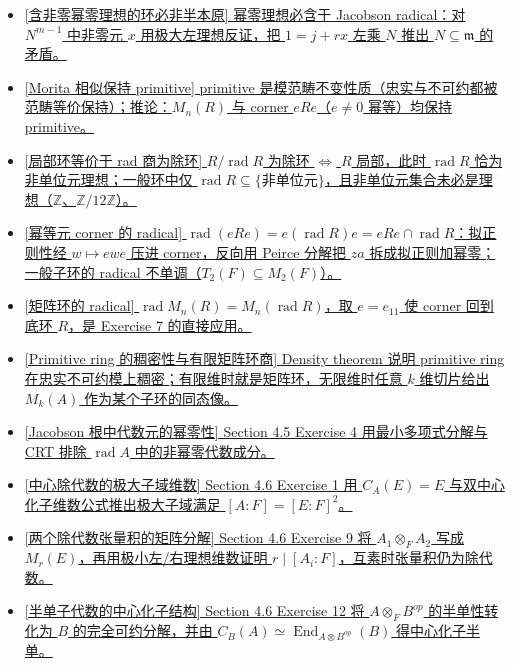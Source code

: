 \documentclass[a4paper]{ctexart}
\theoremstyle{definition}
\theoremstyle{analysis}
\theoremstyle{plain}
\begin{document}
\begin{itemize}
  \item \hyperref[subsec:problem-nilpotent-ideal-not-semiprimitive]{[含非零幂零理想的环必非半本原] 幂零理想必含于 Jacobson radical：对 \(N^{m-1}\) 中非零元 \(x\) 用极大左理想反证，把 \(1=j+rx\) 左乘 \(N\) 推出 \(N\subseteq\mathfrak m\) 的矛盾。}
  \item \hyperref[subsec:problem-morita-primitive]{[Morita 相似保持 primitive] primitive 是模范畴不变性质（忠实与不可约都被范畴等价保持）；推论：\(M_n(R)\) 与 corner \(eRe\)（\(e\neq 0\) 幂等）均保持 primitive。}
  \item \hyperref[subsec:problem-local-rad-division-ring]{[局部环等价于 rad 商为除环] \(R/\operatorname{rad}R\) 为除环 \(\iff\) \(R\) 局部，此时 \(\operatorname{rad}R\) 恰为非单位元理想；一般环中仅 \(\operatorname{rad}R\subseteq\{\text{非单位元}\}\)，且非单位元集合未必是理想（\(\mathbb Z\)、\(\mathbb Z/12\mathbb Z\)）。}
  \item \hyperref[subsec:problem-rad-corner-idempotent]{[幂等元 corner 的 radical] \(\operatorname{rad}(eRe)=e(\operatorname{rad}R)e=eRe\cap\operatorname{rad}R\)：拟正则性经 \(w\mapsto ewe\) 压进 corner，反向用 Peirce 分解把 \(za\) 拆成拟正则加幂零；一般子环的 radical 不单调（\(T_2(F)\subseteq M_2(F)\)）。}
  \item \hyperref[subsec:problem-rad-matrix-ring]{[矩阵环的 radical] \(\operatorname{rad}M_n(R)=M_n(\operatorname{rad}R)\)，取 \(e=e_{11}\) 使 corner 回到底环 \(R\)，是 Exercise 7 的直接应用。}
  \item \hyperref[subsec:problem-density-matrix-image]{[Primitive ring 的稠密性与有限矩阵环商] Density theorem 说明 primitive ring 在忠实不可约模上稠密；有限维时就是矩阵环，无限维时任意 \(k\) 维切片给出 \(M_k(A)\) 作为某个子环的同态像。}
  \item \hyperref[subsec:problem-radical-algebraic-nilpotent]{[Jacobson 根中代数元的幂零性] Section 4.5 Exercise 4 用最小多项式分解与 CRT 排除 \(\operatorname{rad} A\) 中的非幂零代数成分。}
  \item \hyperref[subsec:problem-maximal-subfield-degree]{[中心除代数的极大子域维数] Section 4.6 Exercise 1 用 \(C_A(E)=E\) 与双中心化子维数公式推出极大子域满足 \([A:F]=[E:F]^2\)。}
  \item \hyperref[subsec:problem-tensor-division-coprime]{[两个除代数张量积的矩阵分解] Section 4.6 Exercise 9 将 \(A_1\otimes_F A_2\) 写成 \(M_r(E)\)，再用极小左/右理想维数证明 \(r\mid[A_i:F]\)，互素时张量积仍为除代数。}
  \item \hyperref[subsec:problem-semisimple-subalgebra-centralizer]{[半单子代数的中心化子结构] Section 4.6 Exercise 12 将 \(A\otimes_F B^{op}\) 的半单性转化为 \(B\) 的完全可约分解，并由 \(C_B(A)\simeq\operatorname{End}_{A\otimes B^{op}}(B)\) 得中心化子半单。}

\end{itemize}
\end{document}
